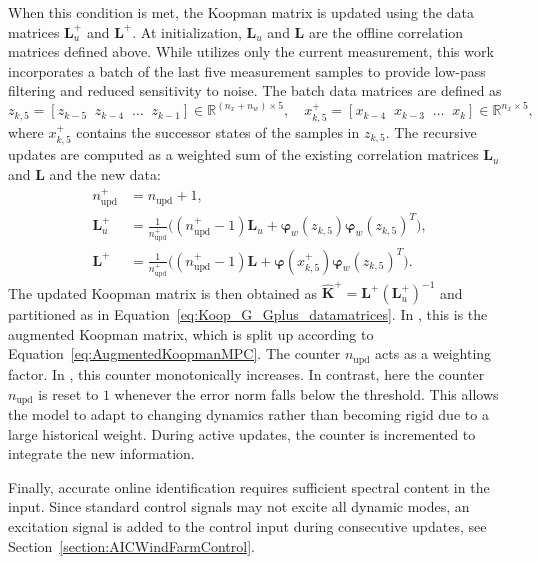 When this condition is met, the Koopman matrix is updated using the data matrices $\mathbf{L}_u^+$ and $\mathbf{L}^+$. At initialization, $\mathbf{L}_u$ and $\mathbf{L}$ are the offline correlation matrices defined above. While \cite{cisneros2020data} utilizes only the current measurement, this work incorporates a batch of the last five measurement samples to provide low-pass filtering and reduced sensitivity to noise. The batch data matrices are defined as
\[
z_{k,5} = [z_{k-5} \;\; z_{k-4} \;\; \dots \;\; z_{k-1}] \in \mathbb{R}^{(n_x + n_w)\times 5}, \quad
x_{k,5}^+ = [x_{k-4} \;\; x_{k-3} \;\; \dots \;\; x_{k}] \in \mathbb{R}^{n_x \times 5},
\]
where $x_{k,5}^+$ contains the successor states of the samples in $z_{k,5}$.
The recursive updates are computed as a weighted sum of the existing correlation matrices $\mathbf{L}_u$ and $\mathbf{L}$ and the new data:
\begin{equation} \label{eq:GA_online}
    \begin{split}
        n_{\text{upd}}^+ &= n_{\text{upd}} + 1,\\
        \mathbf{L}_u^+ &= \frac{1}{n_{\text{upd}}^+} \Big( (n_{\text{upd}}^+-1)\mathbf{L}_u + \bm{\varphi}_w(z_{k,5}) \bm{\varphi}_w(z_{k,5})^T \Big),\\
        \mathbf{L}^+ &= \frac{1}{n_{\text{upd}}^+} \Big( (n_{\text{upd}}^+-1)\mathbf{L} + \bm{\varphi}(x_{k,5}^+) \bm{\varphi}_w(z_{k,5})^T \Big).
    \end{split}
\end{equation}
The updated Koopman matrix is then obtained as $\hat{\bm{K}}^+ = \mathbf{L}^+ (\mathbf{L}_u^+)^{-1}$ and partitioned as in Equation~\eqref{eq:Koop_G_Gplus_datamatrices}. In \cite{dittmer2022data}, this is the augmented Koopman matrix, which is split up according to Equation~\eqref{eq:AugmentedKoopmanMPC}.
The counter $n_{\text{upd}}$ acts as a weighting factor. In \cite{cisneros2020data}, this counter monotonically increases. In contrast, here the counter $n_{\text{upd}}$ is reset to $1$ whenever the error norm falls below the threshold. This allows the model to adapt to changing dynamics rather than becoming rigid due to a large historical weight. During active updates, the counter is incremented to integrate the new information.

Finally, accurate online identification requires sufficient spectral content in the input. Since standard control signals may not excite all dynamic modes, an excitation signal is added to the control input during consecutive updates, see Section~\ref{section:AICWindFarmControl}.

